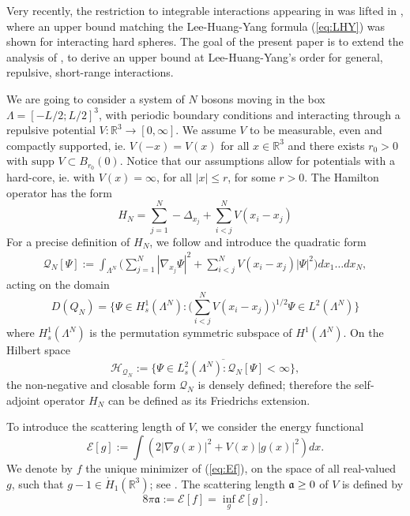 \documentclass[a4paper,11pt]{article}
\def\bR{\mathbb{R}}
\def\cH{\mathcal{H}}
\numberwithin{equation}{section}
\begin{document}
Very recently, the restriction to integrable interactions appearing in \cite{YY,BCS} was lifted in \cite{BBCOS}, where an upper bound matching the Lee-Huang-Yang formula (\ref{eq:LHY}) was shown for interacting hard spheres. The goal of the present paper is to extend the analysis of \cite{BBCOS}, to derive an upper bound at Lee-Huang-Yang's order for general, repulsive, short-range interactions. 

We are going to consider a system of $N$ bosons moving in the box $\Lambda = [-L/2 ; L/2]^3$, with periodic boundary conditions and interacting through a repulsive potential $V : \mathbb{R}^3 \longrightarrow [0,\infty]$. We assume $V$ to be measurable, even and compactly supported, ie. $V(-x) = V(x)$ for all $x \in \bR^3$ and there exists $r_0 > 0$ with $\text{supp } V \subset B_{r_0} (0)$. Notice that our assumptions allow for potentials with a hard-core, ie. with $V(x) = \infty$, for all $|x| \leq r$, for some $r > 0$. The Hamilton operator has the form 
\begin{equation}\label{eq:HN0} H_N = \sum_{j=1}^N -\Delta_{x_j} + \sum^N_{i<j} V (x_i - x_j) \end{equation}
For a precise definition of $H_N$, we follow \cite{FS2} and introduce the quadratic form
\begin{align*}
    \mathcal{Q}_N [\Psi]:=\int_{\Lambda^N} \Big(\sum_{j=1}^N |\nabla_{x_j}\Psi|^2+\sum_{i<j}^N V(x_i-x_j)|\Psi|^2\Big) dx_1 \dots dx_N,
\end{align*}
acting on the domain 
\[ D(Q_N) = \Big\{ \Psi\in H_s^1(\Lambda^N) : \big(\sum_{i<j}^N V(x_i-x_j)\big)^{1/2}\Psi \in L^2(\Lambda^N) \Big\} \]
where $H_s^1 (\Lambda^N)$ is the permutation symmetric subspace of $H^1 (\Lambda^N)$. On the Hilbert space 
\[ \cH_{\mathcal{Q}_N}:=\overline{ \{ \Psi\in L^2_s (\Lambda^N): \mathcal{Q}_N [\Psi]<\infty\}},\] the non-negative and closable form $\mathcal{Q}_N$ is densely defined; therefore the self-adjoint operator $H_N$ can be defined as its Friedrichs extension.

To introduce the scattering length of $V$, we consider the energy functional 
\begin{equation}\label{eq:Ef}
    \mathcal{E}[g]:=\int \left(2|\nabla g (x)|^2+V(x) |g (x)|^2 \right)dx .
\end{equation}
We denote by $f$ the unique minimizer of (\ref{eq:Ef}), on the space of all real-valued $g$, such that $g-1\in \dot{H}_1(\mathbb R^3)$; see \cite{RT}. The scattering length $\frak{a} \geq 0$ of $V$ is defined by 
\begin{equation}\label{eq:defa}
    8\pi \mathfrak{a}:= \mathcal{E} [f] = \inf_g \mathcal{E}[g].
\end{equation} 
\end{document}
